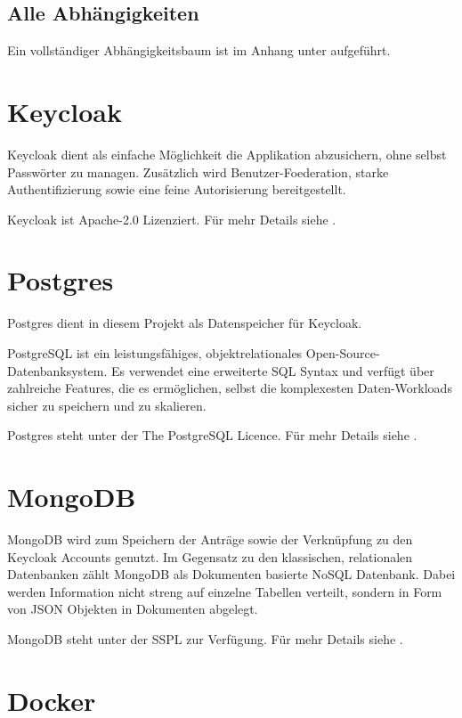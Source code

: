 \subsection{Alle Abhängigkeiten}
Ein vollständiger Abhängigkeitsbaum ist im Anhang unter  aufgeführt.

\section{Keycloak}\label{sec:keycloak}

Keycloak dient als einfache Möglichkeit die Applikation abzusichern, ohne selbst Passwörter zu managen.
Zusätzlich wird \gls{Benutzer-Foederation}, starke Authentifizierung sowie eine feine Autorisierung bereitgestellt.
\cite{about-keycloak}

Keycloak ist Apache-2.0 Lizenziert.
Für mehr Details siehe .

\section{Postgres}\label{sec:postgres}

Postgres dient in diesem Projekt als Datenspeicher für Keycloak.

PostgreSQL ist ein leistungsfähiges, objektrelationales Open-Source-Datenbanksystem.
Es verwendet eine erweiterte \ac{SQL} Syntax und verfügt über zahlreiche Features,
die es ermöglichen, selbst die komplexesten Daten-Workloads sicher zu speichern und zu skalieren.
\cite{about-postgres}

Postgres steht unter der The PostgreSQL Licence.
Für mehr Details siehe .


\section{MongoDB}\label{sec:mongodb}

MongoDB wird zum Speichern der Anträge sowie der Verknüpfung zu den Keycloak Accounts genutzt.
Im Gegensatz zu den klassischen, relationalen Datenbanken zählt MongoDB als Dokumenten basierte NoSQL Datenbank.
Dabei werden Information nicht streng auf einzelne Tabellen verteilt, sondern in Form von \ac{JSON} Objekten in Dokumenten abgelegt.

MongoDB steht unter der \acl{SSPL} zur Verfügung.
Für mehr Details siehe .

\section{Docker}\label{sec:docker}

